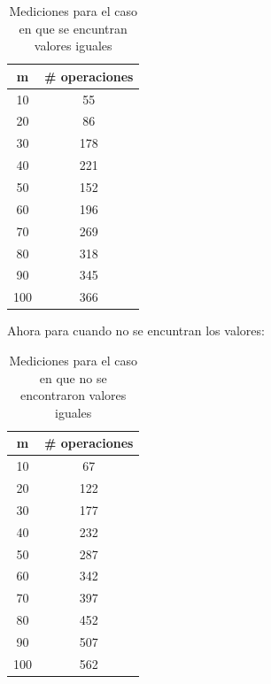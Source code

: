 \documentclass[12pt,twoside]{article}
\begin{document}
\begin{table}[htbp]
    \begin{center}
        \begin{tabular}{|c|c|}
            \hline
            \textbf{m} & \textbf{\# operaciones} \\
            \hline \hline
            10 &	55 \\ \hline
            20 &	86 \\ \hline
            30 &	178 \\ \hline
            40 &	221 \\ \hline
            50 &	152 \\ \hline
            60 &	196 \\ \hline
            70 & 269 \\ \hline
            80 & 318 \\ \hline
            90 & 345 \\ \hline
            100 & 366 \\ \hline
        \end{tabular}
        \caption{Mediciones para el caso en que se encuntran valores iguales}
        \label{tabla:analisis2}
    \end{center}
\end{table}
\newline
Ahora para cuando no se encuntran los valores:
\begin{table}[htbp]
    \begin{center}
        \begin{tabular}{|c|c|}
            \hline
            \textbf{m} & \textbf{\# operaciones} \\
            \hline \hline
            10 &	67 \\ \hline
            20 &	122 \\ \hline
            30 &	177 \\ \hline
            40 &	232 \\ \hline
            50 &	287 \\ \hline
            60 &	342 \\ \hline
            70 & 397 \\ \hline
            80 & 452 \\ \hline
            90 & 507 \\ \hline
            100 & 562 \\ \hline
        \end{tabular}
        \caption{Mediciones para el caso en que no se encontraron valores iguales}
        \label{tabla:analisis3}
    \end{center}
\end{table}
\end{document}
